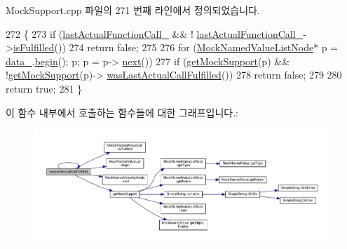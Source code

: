 Mock\+Support.\+cpp 파일의 271 번째 라인에서 정의되었습니다.


\begin{DoxyCode}
272 \{
273     \textcolor{keywordflow}{if} (\hyperlink{class_mock_support_aadd48976efe51d36597ebe298e6b9233}{lastActualFunctionCall\_} && !
      \hyperlink{class_mock_support_aadd48976efe51d36597ebe298e6b9233}{lastActualFunctionCall\_}->\hyperlink{class_mock_checked_actual_call_a202e2a29251e33b754b71a2cef8a6556}{isFulfilled}())
274         \textcolor{keywordflow}{return} \textcolor{keyword}{false};
275 
276     \textcolor{keywordflow}{for} (\hyperlink{class_mock_named_value_list_node}{MockNamedValueListNode}* p = \hyperlink{class_mock_support_a26b06d2d43a7804c9aa5808409c0c1ee}{data\_}.\hyperlink{class_mock_named_value_list_a4a5976d05542385eb64ea73eee7fc59c}{begin}(); p; p = p->
      \hyperlink{class_mock_named_value_list_node_adaf0ca3232d35f7efae1bade86b8027e}{next}())
277         \textcolor{keywordflow}{if} (\hyperlink{class_mock_support_a575951d416e49f54fd1a3fc4823609e3}{getMockSupport}(p) && !\hyperlink{class_mock_support_a575951d416e49f54fd1a3fc4823609e3}{getMockSupport}(p)->
      \hyperlink{class_mock_support_acd935c1e39f057e15d9d266481f2b1e1}{wasLastActualCallFulfilled}())
278                 \textcolor{keywordflow}{return} \textcolor{keyword}{false};
279 
280     \textcolor{keywordflow}{return} \textcolor{keyword}{true};
281 \}
\end{DoxyCode}


이 함수 내부에서 호출하는 함수들에 대한 그래프입니다.\+:
\nopagebreak
\begin{figure}[H]
\begin{center}
\leavevmode
\includegraphics[width=350pt]{class_mock_support_acd935c1e39f057e15d9d266481f2b1e1_cgraph}
\end{center}
\end{figure}




